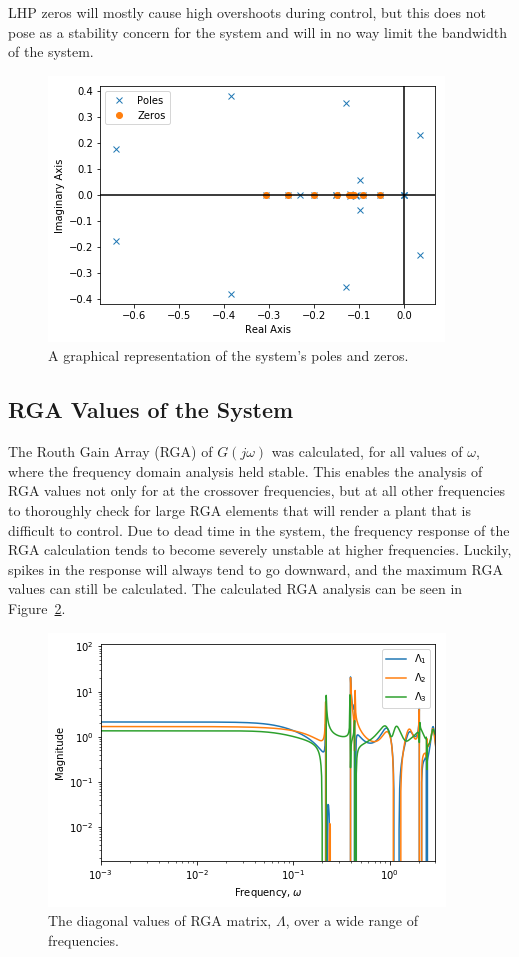 LHP zeros will mostly cause high overshoots during control, but this does not pose as a stability concern for the system and will in no way limit the bandwidth of the system.

\begin{figure}[H]
	\centering
	\includegraphics[width=0.7\linewidth]{Figures/Poles_and_Zeros}
	\caption{A graphical representation of the system's poles and zeros.}
	\label{fig:polesandzeros}
\end{figure}

\subsection{RGA Values of the System}
\label{sec:RGA Calculation}

The Routh Gain Array (RGA) of $G(j\omega)$ was calculated, for all values of $\omega$, where the frequency domain analysis held stable. This enables the analysis of RGA values not only for at the crossover frequencies, but at all other frequencies to thoroughly check for large RGA elements that will render a plant that is difficult to control. Due to dead time in the system, the frequency response of the RGA calculation tends to become severely unstable at higher frequencies. Luckily, spikes in the response will always tend to go downward, and the maximum RGA values can still be calculated. The calculated RGA analysis can be seen in Figure~\ref{fig:rga-values}.

\begin{figure}[H]
	\centering
	\includegraphics[width=0.7\linewidth]{"Figures/RGA Values"}
	\caption{The diagonal values of RGA matrix, $\Lambda$, over a wide range of frequencies.}
	\label{fig:rga-values}
\end{figure}

